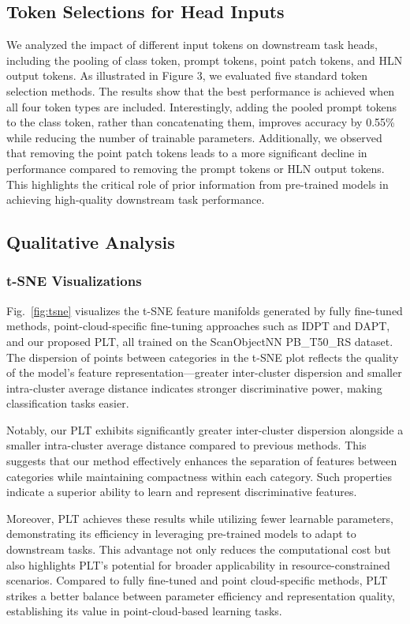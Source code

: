 \subsection{Token Selections for Head Inputs}
We analyzed the impact of different input tokens on downstream task heads, including the pooling of class token, prompt tokens, point patch tokens, and HLN output tokens. As illustrated in Figure 3, we evaluated five standard token selection methods. The results show that the best performance is achieved when all four token types are included. Interestingly, adding the pooled prompt tokens to the class token, rather than concatenating them, improves accuracy by 0.55\% while reducing the number of trainable parameters. Additionally, we observed that removing the point patch tokens leads to a more significant decline in performance compared to removing the prompt tokens or HLN output tokens. This highlights the critical role of prior information from pre-trained models in achieving high-quality downstream task performance.

\subsection{Qualitative Analysis}

\subsubsection{t-SNE Visualizations}
Fig.~\ref{fig:tsne} visualizes the t-SNE feature manifolds generated by fully fine-tuned methods, point-cloud-specific fine-tuning approaches such as IDPT and DAPT, and our proposed PLT, all trained on the ScanObjectNN PB\_T50\_RS dataset. The dispersion of points between categories in the t-SNE plot reflects the quality of the model's feature representation—greater inter-cluster dispersion and smaller intra-cluster average  distance  indicates stronger discriminative power, making classification tasks easier.

Notably, our PLT exhibits significantly greater inter-cluster dispersion alongside a smaller intra-cluster average  distance compared to previous methods. This suggests that our method effectively enhances the separation of features between categories while maintaining compactness within each category. Such properties indicate a superior ability to learn and represent discriminative features.

Moreover, PLT achieves these results while utilizing fewer learnable parameters, demonstrating its efficiency in leveraging pre-trained models to adapt to downstream tasks. This advantage not only reduces the computational cost but also highlights PLT’s potential for broader applicability in resource-constrained scenarios. Compared to fully fine-tuned and point cloud-specific methods, PLT strikes a better balance between parameter efficiency and representation quality, establishing its value in point-cloud-based learning tasks.

